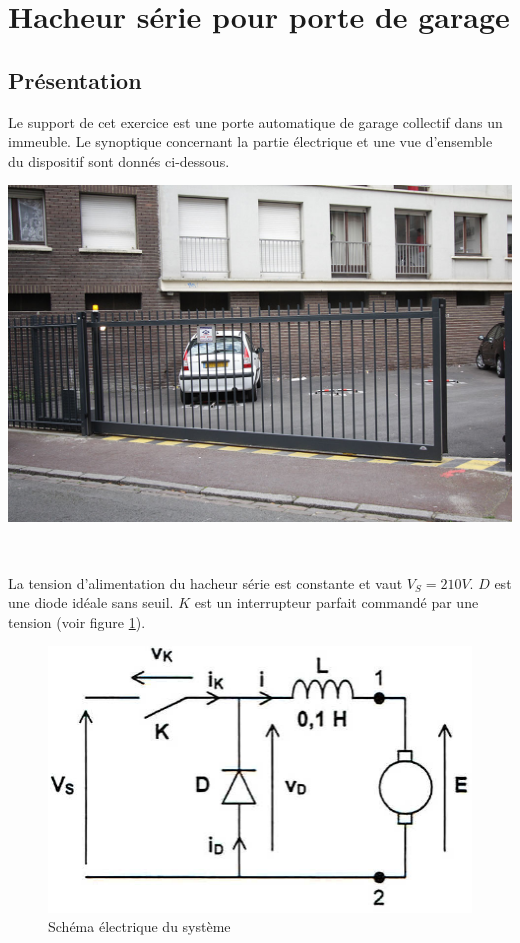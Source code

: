 

\section{Hacheur série pour porte de garage}

\subsection{Présentation}

\begin{minipage}{0.6\linewidth}
Le support de cet exercice est une porte automatique de garage collectif dans un immeuble. Le
synoptique concernant la partie électrique et une vue d'ensemble du dispositif sont donnés ci-dessous.
\end{minipage}\hfill
\begin{minipage}{0.35\linewidth}
\begin{center}
\includegraphics[width=.9\linewidth]{img/fig01}
\end{center}
\end{minipage}

~\

La tension d'alimentation du hacheur série est constante et vaut $V_S = 210 V$. $D$ est une diode idéale sans seuil. $K$ est un interrupteur parfait commandé
par une tension (voir figure \ref{schema_elec}).

\begin{figure}[ht!]
\begin{center}
 \includegraphics[width=.6\linewidth]{img/schema_elec}
\end{center}
\caption{\label{schema_elec}Schéma électrique du système}
\end{figure}

